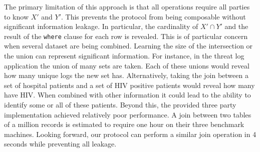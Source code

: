 The primary limitation of this approach is that all operations require all parties to know $X'$ and $Y'$. This prevents the protocol from being composable without significant information leakage. In particular, the cardinality of $X'\cap Y'$ and the result of the \texttt{where} clause for each row is revealed. This is of particular concern when several dataset are being combined. Learning the size of the intersection or the union can represent significant information. For instance, in the threat log application the union of many sets are taken. Each of these unions would reveal how many unique logs the new set has. Alternatively, taking the join between a set of hospital patients and a set of HIV positive patients would reveal how many have HIV. When combined with other information it could lead to the ability to identify some or all of these patients. Beyond this, the provided three party implementation achieved relatively poor performance. A join between two tables of a million records is estimated to require one hour on their three benchmark machines\cite{LTW13}. Looking forward, our protocol can perform a similar join operation in 4 seconds while preventing all leakage. 


